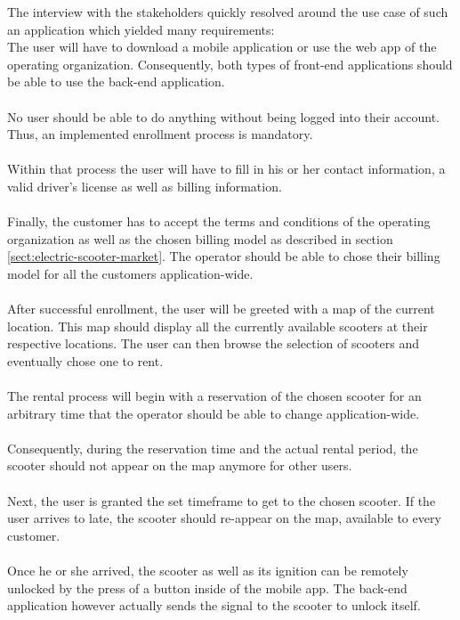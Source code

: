 \documentclass[12pt,a4paper]{report}
\begin{document}
The interview with the stakeholders quickly resolved around the use case
of such an application which yielded many requirements:\\

The user will have to download a mobile application or use the web app
of the operating organization. Consequently, both types of front-end applications
should be able to use the back-end application.\\\\
No user should be able to do anything without being logged into their account.
Thus, an implemented enrollment process is mandatory.\\\\
Within that process the user will have to fill in his or her
contact information, a valid driver's license as well as billing information.\\\\
Finally, the customer has to accept the terms and conditions of the operating
organization as well as the chosen billing model as described in
section \ref{sect:electric-scooter-market}. The operator should be able to chose
their billing model for all the customers application-wide.\\\\
After successful enrollment, the user will be greeted with a map of the current
location. This map should display all the currently available scooters at
their respective locations. The user can then browse the selection
of scooters and eventually chose one to rent.\\\\
The rental process will begin with a reservation of the chosen scooter for
an arbitrary time that the operator should be able to change application-wide.\\\\
Consequently, during the reservation time and the actual rental period,
the scooter should not appear on the map anymore for other users.\\\\
Next, the user is granted the set timeframe to get to the chosen scooter.
If the user arrives to late, the scooter should re-appear on the map,
available to every customer.\\\\
Once he or she arrived, the scooter as well as its ignition can be remotely
unlocked by the press of a button inside of the mobile app.
The back-end application however actually sends the signal to the scooter to
unlock itself.\\\\
\end{document}

